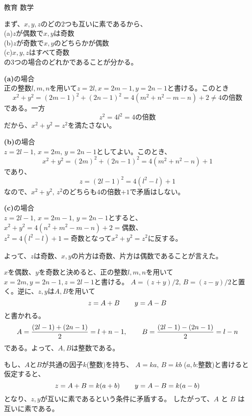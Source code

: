 \documentclass[fleqn]{jbook}
\begin{document}
\begin{answer}{教育 数学}{}
\begin{subanswers}
\begin{subsubanswers}
  \end{subsubanswers}

  
\SubAnswer
  \begin{subsubanswers}
  \SubSubAnswer
    まず、$x,y,z$のどの$2$つも互いに素であるから、\\
    (a)\quad $z$が偶数で$x,y$は奇数\\
    (b)\quad $z$が奇数で$x,y$のどちらかが偶数\\
    (c)\quad $x,y,z$はすべて奇数\\
    の$3$つの場合のどれかであることが分かる。

\vspace*{1mm}
    {\bf (a)}の場合\\
    正の整数$l,m,n$を用いて$z=2l,x=2m-1,y=2n-1$と書ける。このとき
%
    \[ x^2+y^2=(2m-1)^2+(2n-1)^2=4(m^2+n^2-m-n)+2\neq \mbox{$4$の倍数} \]
%
    である。一方
%
    \[ z^2=4l^2 =\mbox{$4$の倍数} \]
%
    だから、$x^2+y^2=z^2$を満たさない。

\vspace*{1mm}
    {\bf (b)}の場合\\
    $z=2l-1,\,x=2m,\,y=2n-1$としてよい。このとき、
%
    \[ x^2+y^2=(2m)^2+(2n-1)^2=4(m^2+n^2-n)+1 \]
%
    であり、
%
    \[ z=(2l-1)^2=4(l^2-l)+1 \]
%
    なので、$x^2+y^2,\,z^2$のどちらも$4$の倍数$+1$で矛盾はしない。

\vspace*{1mm}
    {\bf (c)}の場合\\
    $z=2l-1,\,x=2m-1,\,y=2n-1$とすると、
    $x^2+y^2=4(n^2+m^2-m-n)+2=\mbox{偶数}$、\\
    $z^2=4(l^2-l)+1=\mbox{奇数}$となって$x^2+y^2=z^2$に反する。

\vspace*{2mm}
    よって、$z$は奇数、$x,y$の片方は奇数、片方は偶数であることが言えた。

  \SubSubAnswer
    $x$を偶数、$y$を奇数と決めると、正の整数$l,m,n$を用いて
    $x=2m,y=2n-1,z=2l-1$と書ける。
    $A=(z+y)/2,\,B=(z-y)/2$と置く。逆に、$z,y$は$A,B$を用いて
%
    \[ z=A+B \hskip 0.3 in y=A-B \]
%
    と書かれる。
%
    \[ A = {\frac{(2l-1)+(2n-1)}{2}}=l+n-1, \hskip 0.3 in%
       B = {\frac{(2l-1)-(2n-1)}{2}}=l-n \]
%
    である。よって、$A,B$は整数である。

    もし、$A$と$B$が共通の因子$k$(整数)を持ち、
    $A=ka,\,B=kb\;$($a,b$:整数)と書けると仮定すると、 
%
    \[ z=A+B=k(a+b) \hskip 0.3 in  y=A-B=k(a-b) \]
%
    となり、$z,y$が互いに素であるという条件に矛盾する。
    したがって、$A$ と $B$ は互いに素である。


\end{subsubanswers}
\end{subanswers}
\end{answer}
\end{document}
